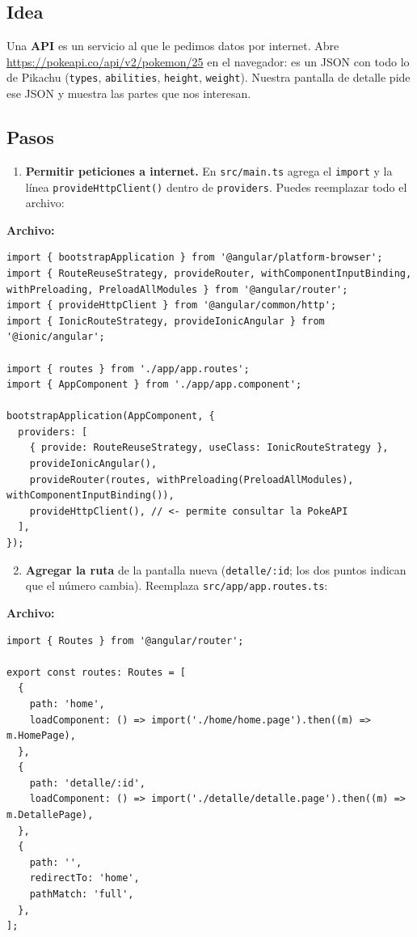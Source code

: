 \documentclass[11pt,a4paper]{article}
\newcommand{\cmd}[1]{\texttt{#1}}
\newcommand{\archivo}[1]{\par\smallskip\noindent\textbf{Archivo:} \texttt{\detokenize{#1}}\par\nopagebreak}
\begin{document}
\subsection*{Idea}
Una \textbf{API} es un servicio al que le pedimos datos por internet. Abre \url{https://pokeapi.co/api/v2/pokemon/25}
en el navegador: es un JSON con todo lo de Pikachu (\texttt{types}, \texttt{abilities}, \texttt{height}, \texttt{weight}).
Nuestra pantalla de detalle pide ese JSON y muestra las partes que nos interesan.

\subsection*{Pasos}
\begin{enumerate}
\item \textbf{Permitir peticiones a internet.} En \texttt{src/main.ts} agrega el \texttt{import} y la l\'inea \cmd{provideHttpClient()} dentro de \texttt{providers}. Puedes reemplazar todo el archivo:
\end{enumerate}
\archivo{src/main.ts}
\begin{lstlisting}
import { bootstrapApplication } from '@angular/platform-browser';
import { RouteReuseStrategy, provideRouter, withComponentInputBinding, withPreloading, PreloadAllModules } from '@angular/router';
import { provideHttpClient } from '@angular/common/http';
import { IonicRouteStrategy, provideIonicAngular } from '@ionic/angular';

import { routes } from './app/app.routes';
import { AppComponent } from './app/app.component';

bootstrapApplication(AppComponent, {
  providers: [
    { provide: RouteReuseStrategy, useClass: IonicRouteStrategy },
    provideIonicAngular(),
    provideRouter(routes, withPreloading(PreloadAllModules), withComponentInputBinding()),
    provideHttpClient(), // <- permite consultar la PokeAPI
  ],
});
\end{lstlisting}

\begin{enumerate}\setcounter{enumi}{1}
\item \textbf{Agregar la ruta} de la pantalla nueva (\texttt{detalle/:id}; los dos puntos indican que el n\'umero cambia). Reemplaza \texttt{src/app/app.routes.ts}:
\end{enumerate}
\archivo{src/app/app.routes.ts}
\begin{lstlisting}
import { Routes } from '@angular/router';

export const routes: Routes = [
  {
    path: 'home',
    loadComponent: () => import('./home/home.page').then((m) => m.HomePage),
  },
  {
    path: 'detalle/:id',
    loadComponent: () => import('./detalle/detalle.page').then((m) => m.DetallePage),
  },
  {
    path: '',
    redirectTo: 'home',
    pathMatch: 'full',
  },
];
\end{lstlisting}
\end{document}
